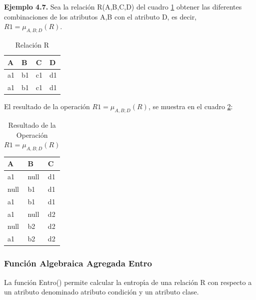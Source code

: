 \textbf{Ejemplo 4.7.} Sea la relaci\'on R(A,B,C,D) del cuadro \ref{t1} obtener las diferentes combinaciones de los
atributos A,B con el atributo D, es decir, $R1= \mu_{A,B;D}(R).$\\

\begin{center}
\begin{table}[h]
\begin{center}
\begin{tabular}{|p{10mm}|p{10mm}|p{10mm}|p{10mm}|} \hline
\textbf{A} & \textbf{B} & \textbf{C} & \textbf{D}\\ \hline
a1 & b1 & c1 & d1\\ \hline
a1 & b1 & c1 & d1\\ \hline
\end{tabular}
\end{center}
\caption{Relaci\'on R}
\label{t1}
\end{table}
\end{center}

El resultado de la operaci\'on $R1= \mu_{A,B;D}(R)$, se muestra en el cuadro \ref{t2}:\\

\begin{center}
\begin{table}[h]
\begin{center}
\begin{tabular}{|p{10mm}|p{10mm}|p{10mm}|} \hline
\textbf{A} & \textbf{B} & \textbf{C}\\ \hline
a1 & null & d1\\ \hline
null & b1 & d1\\ \hline
a1 & b1 & d1\\ \hline
a1 & null & d2\\ \hline
null & b2 & d2\\ \hline
a1 & b2 & d2\\ \hline
\end{tabular}
\end{center}
\caption{Resultado de la Operaci\'on $R1= \mu_{A,B;D}(R)$}
\label{t2}
\end{table}
\end{center}

\subsubsection{Funci\'on Algebraica Agregada Entro}
La funci\'on Entro() permite calcular la entrop\'\i{}a de una relaci\'on R con respecto a un atributo denominado
atributo condici\'on y un atributo clase.\\

